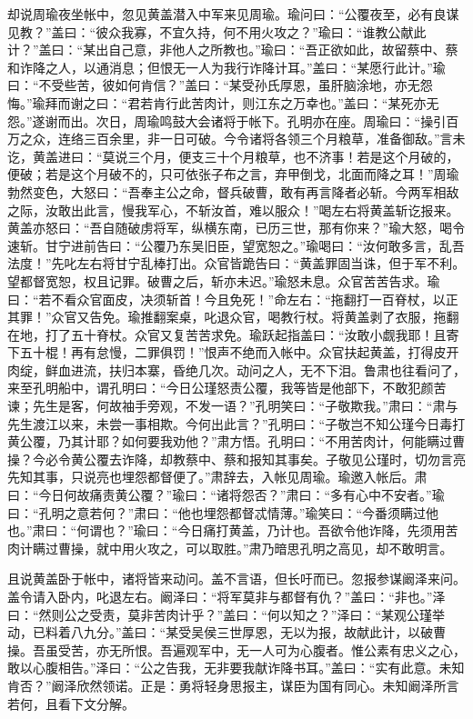 却说周瑜夜坐帐中，忽见黄盖潜入中军来见周瑜。瑜问曰：“公覆夜至，必有良谋见教？”盖曰：“彼众我寡，不宜久持，何不用火攻之？”瑜曰：“谁教公献此计？”盖曰：“某出自己意，非他人之所教也。”瑜曰：“吾正欲如此，故留蔡中、蔡和诈降之人，以通消息；但恨无一人为我行诈降计耳。”盖曰：“某愿行此计。”瑜曰：“不受些苦，彼如何肯信？”盖曰：“某受孙氏厚恩，虽肝脑涂地，亦无怨悔。”瑜拜而谢之曰：“君若肯行此苦肉计，则江东之万幸也。”盖曰：“某死亦无怨。”遂谢而出。次日，周瑜鸣鼓大会诸将于帐下。孔明亦在座。周瑜曰：“操引百万之众，连络三百余里，非一日可破。今令诸将各领三个月粮草，准备御敌。”言未讫，黄盖进曰：“莫说三个月，便支三十个月粮草，也不济事！若是这个月破的，便破；若是这个月破不的，只可依张子布之言，弃甲倒戈，北面而降之耳！”周瑜勃然变色，大怒曰：“吾奉主公之命，督兵破曹，敢有再言降者必斩。今两军相敌之际，汝敢出此言，慢我军心，不斩汝首，难以服众！”喝左右将黄盖斩讫报来。黄盖亦怒曰：“吾自随破虏将军，纵横东南，已历三世，那有你来？”瑜大怒，喝令速斩。甘宁进前告曰：“公覆乃东吴旧臣，望宽恕之。”瑜喝曰：“汝何敢多言，乱吾法度！”先叱左右将甘宁乱棒打出。众官皆跪告曰：“黄盖罪固当诛，但于军不利。望都督宽恕，权且记罪。破曹之后，斩亦未迟。”瑜怒未息。众官苦苦告求。瑜曰：“若不看众官面皮，决须斩首！今且免死！”命左右：“拖翻打一百脊杖，以正其罪！”众官又告免。瑜推翻案桌，叱退众官，喝教行杖。将黄盖剥了衣服，拖翻在地，打了五十脊杖。众官又复苦苦求免。瑜跃起指盖曰：“汝敢小觑我耶！且寄下五十棍！再有怠慢，二罪俱罚！”恨声不绝而入帐中。众官扶起黄盖，打得皮开肉绽，鲜血进流，扶归本寨，昏绝几次。动问之人，无不下泪。鲁肃也往看问了，来至孔明船中，谓孔明曰：“今日公瑾怒责公覆，我等皆是他部下，不敢犯颜苦谏；先生是客，何故袖手旁观，不发一语？”孔明笑曰：“子敬欺我。”肃曰：“肃与先生渡江以来，未尝一事相欺。今何出此言？”孔明曰：“子敬岂不知公瑾今日毒打黄公覆，乃其计耶？如何要我劝他？”肃方悟。孔明曰：“不用苦肉计，何能瞒过曹操？今必令黄公覆去诈降，却教蔡中、蔡和报知其事矣。子敬见公瑾时，切勿言亮先知其事，只说亮也埋怨都督便了。”肃辞去，入帐见周瑜。瑜邀入帐后。肃曰：“今日何故痛责黄公覆？”瑜曰：“诸将怨否？”肃曰：“多有心中不安者。”瑜曰：“孔明之意若何？”肃曰：“他也埋怨都督忒情薄。”瑜笑曰：“今番须瞒过他也。”肃曰：“何谓也？”瑜曰：“今日痛打黄盖，乃计也。吾欲令他诈降，先须用苦肉计瞒过曹操，就中用火攻之，可以取胜。”肃乃暗思孔明之高见，却不敢明言。

且说黄盖卧于帐中，诸将皆来动问。盖不言语，但长吁而已。忽报参谋阚泽来问。盖令请入卧内，叱退左右。阚泽曰：“将军莫非与都督有仇？”盖曰：“非也。”泽曰：“然则公之受责，莫非苦肉计乎？”盖曰：“何以知之？”泽曰：“某观公瑾举动，已料着八九分。”盖曰：“某受吴侯三世厚恩，无以为报，故献此计，以破曹操。吾虽受苦，亦无所恨。吾遍观军中，无一人可为心腹者。惟公素有忠义之心，敢以心腹相告。”泽曰：“公之告我，无非要我献诈降书耳。”盖曰：“实有此意。未知肯否？”阚泽欣然领诺。正是：勇将轻身思报主，谋臣为国有同心。未知阚泽所言若何，且看下文分解。